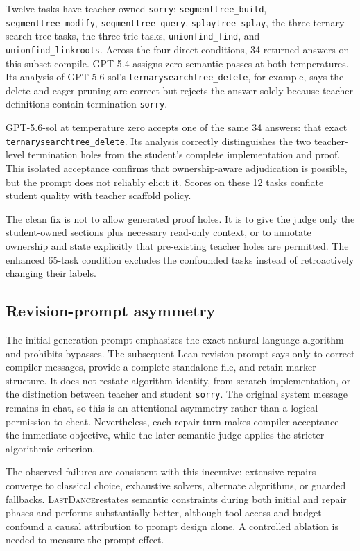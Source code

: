 \documentclass{article}
\newcommand{\task}[1]{\texttt{#1}}
\newcommand{\lastdance}{\textsc{LastDance}}
\begin{document}
Twelve tasks have teacher-owned \texttt{sorry}: \task{segmenttree\_build},
\task{segmenttree\_modify}, \task{segmenttree\_query}, \task{splaytree\_splay}, the
three ternary-search-tree tasks, the three trie tasks, \task{unionfind\_find}, and
\task{unionfind\_linkroots}.  Across the four direct conditions, 34 returned answers on
this subset compile.  GPT-5.4 assigns zero semantic passes at both temperatures.  Its
analysis of GPT-5.6-sol's \task{ternarysearchtree\_delete}, for example, says the delete
and eager pruning are correct but rejects the answer solely because teacher definitions
contain termination \texttt{sorry}.

GPT-5.6-sol at temperature zero accepts one of the same 34 answers: that exact
\task{ternarysearchtree\_delete}.  Its analysis correctly distinguishes the two
teacher-level termination holes from the student's complete implementation and proof.
This isolated acceptance confirms that ownership-aware adjudication is possible, but
the prompt does not reliably elicit it.  Scores on these 12 tasks conflate student
quality with teacher scaffold policy.

The clean fix is not to allow generated proof holes.  It is to give the judge only the
student-owned sections plus necessary read-only context, or to annotate ownership and
state explicitly that pre-existing teacher holes are permitted.  The enhanced 65-task
condition excludes the confounded tasks instead of retroactively changing their labels.

\subsection{Revision-prompt asymmetry}
\label{sec:prompt-audit}

The initial generation prompt emphasizes the exact natural-language algorithm and
prohibits bypasses.  The subsequent Lean revision prompt says only to correct compiler
messages, provide a complete standalone file, and retain marker structure.  It does not
restate algorithm identity, from-scratch implementation, or the distinction between
teacher and student \texttt{sorry}.  The original system message remains in chat, so
this is an attentional asymmetry rather than a logical permission to cheat.  Nevertheless,
each repair turn makes compiler acceptance the immediate objective, while the later
semantic judge applies the stricter algorithmic criterion.

The observed failures are consistent with this incentive: extensive repairs converge
to classical choice, exhaustive solvers, alternate algorithms, or guarded fallbacks.
\lastdance restates semantic constraints during both initial and repair phases
and performs substantially better, although tool access and budget confound a causal
attribution to prompt design alone.  A controlled ablation is needed to measure the
prompt effect.
\end{document}
